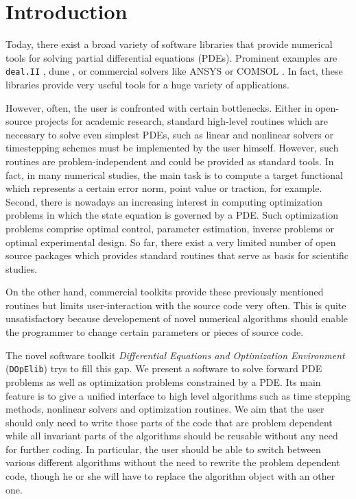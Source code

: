 \documentclass[prodmode,acmtoms]{acmsmall}
\numberwithin{equation}{section}
\newcommand{\deal}{\texttt{deal.II}}
\newcommand{\dope}{\texttt{DOpElib}}
\begin{document}
\section{Introduction}
\label{introduction}
Today, there exist a broad variety of software libraries
that provide numerical tools for solving partial differential
equations (PDEs). Prominent examples are 
\deal{} \cite{dealnew}, dune \cite{dune} , 
or commercial solvers like ANSYS \cite{ansys} or COMSOL \cite{comsol}. 
In fact, these libraries provide very useful tools 
for a huge variety of applications. 

However, often, the user is confronted with 
certain bottlenecks. Either in open-source projects for academic research, 
standard high-level routines 
which are necessary to solve even simplest PDEs,
such as linear and nonlinear solvers or timestepping schemes must be implemented 
by the user himself. However, such routines are problem-independent 
and could be provided as standard tools. In fact, in many 
numerical studies, the main task is to compute a  
target functional which represents a certain error norm,
point value or traction, for example.
Second, there is nowadays an increasing interest in computing 
optimization problems in which the state equation is governed 
by a PDE. Such optimization problems comprise optimal control,
parameter estimation, inverse problems or optimal experimental design. 
So far, there exist a very limited number of open source packages
which provides standard routines that serve as basis for scientific studies.

On the other hand, 
commercial toolkits provide these previously mentioned routines but limits user-interaction
with the source code very often. This is quite unsatisfactory because
developement of novel numerical algorithms should enable the programmer
to change certain parameters or pieces of source code. 


The novel software toolkit 
\textit{Differential Equations and Optimization Environment} (\dope{}) 
trys to fill this gap. We present a software
to solve forward PDE
problems as well as optimization problems constrained by a PDE. 
Its main feature is to give a unified interface to high level algorithms such as 
time stepping methods, nonlinear solvers and optimization routines. 
We aim that the user should only need to write those parts
of the code that are problem dependent while all invariant parts of the algorithms
should be reusable without any need for further coding.
In particular, the user should be able to switch between various different 
algorithms without the need to rewrite the problem dependent code, though he or she will
have to replace the algorithm object with an other one. 
\end{document}
